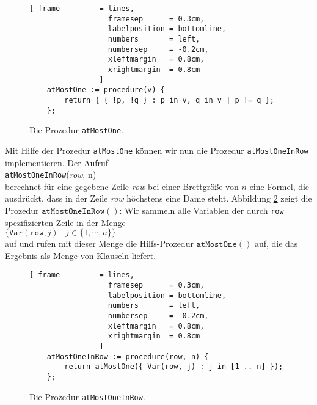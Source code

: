 \begin{figure}[!ht]
  \centering
\begin{Verbatim}[ frame         = lines, 
                  framesep      = 0.3cm, 
                  labelposition = bottomline,
                  numbers       = left,
                  numbersep     = -0.2cm,
                  xleftmargin   = 0.8cm,
                  xrightmargin  = 0.8cm
                ]
    atMostOne := procedure(v) {
        return { { !p, !q } : p in v, q in v | p != q };
    };
\end{Verbatim}
\vspace*{-0.3cm}
  \caption{Die Prozedur \texttt{atMostOne}.}
  \label{fig:atMostOne}
\end{figure}

Mit Hilfe der Prozedur \texttt{atMostOne} k\"{o}nnen wir nun die Prozedur
\texttt{atMostOneInRow} implementieren.  Der Aufruf \\[0.2cm]
\hspace*{1.3cm} \texttt{atMostOneInRow}(\textsl{row}, n) \\[0.2cm]
berechnet f\"{u}r eine gegebene Zeile \textsl{row} bei einer Brettgr\"{o}\ss{}e von $n$ eine Formel,
die ausdr\"{u}ckt, dass in der Zeile \textsl{row} h\"{o}chstens eine Dame steht.
Abbildung \ref{fig:atMostOneInRow} zeigt die
Prozedur $\texttt{atMostOneInRow}()$: Wir sammeln alle Variablen der durch \texttt{row}
spezifizierten Zeile
in der Menge 
\\[0.2cm]
\hspace*{1.3cm}
$\bigl\{ \mathtt{Var}(\mathtt{row},j) \mid j \in \{1, \cdots, n \} \bigr\}$
\\[0.2cm]
 auf und rufen mit dieser Menge die Hilfs-Prozedur $\texttt{atMostOne}()$ auf, die das Ergebnis
als Menge von Klauseln liefert.

\begin{figure}[!ht]
  \centering
\begin{Verbatim}[ frame         = lines, 
                  framesep      = 0.3cm, 
                  labelposition = bottomline,
                  numbers       = left,
                  numbersep     = -0.2cm,
                  xleftmargin   = 0.8cm,
                  xrightmargin  = 0.8cm
                ]
    atMostOneInRow := procedure(row, n) {
        return atMostOne({ Var(row, j) : j in [1 .. n] });
    };
\end{Verbatim}
\vspace*{-0.3cm}
  \caption{Die Prozedur \texttt{atMostOneInRow}.}
  \label{fig:atMostOneInRow}
\end{figure}

